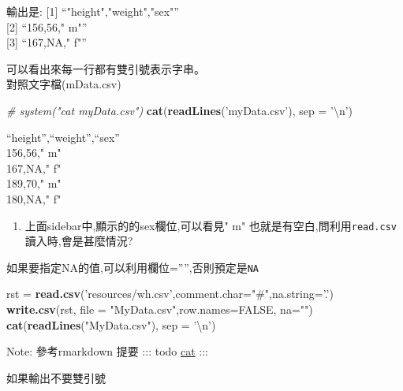 \documentclass[]{book}
\newenvironment{Shaded}{\begin{snugshade}}{\end{snugshade}}
\newcommand{\CharTok}[1]{\textcolor[rgb]{0.31,0.60,0.02}{#1}}
\newcommand{\CommentTok}[1]{\textcolor[rgb]{0.56,0.35,0.01}{\textit{#1}}}
\newcommand{\DataTypeTok}[1]{\textcolor[rgb]{0.13,0.29,0.53}{#1}}
\newcommand{\KeywordTok}[1]{\textcolor[rgb]{0.13,0.29,0.53}{\textbf{#1}}}
\newcommand{\NormalTok}[1]{#1}
\newcommand{\OtherTok}[1]{\textcolor[rgb]{0.56,0.35,0.01}{#1}}
\newcommand{\StringTok}[1]{\textcolor[rgb]{0.31,0.60,0.02}{#1}}
\providecommand{\tightlist}{%
  \setlength{\itemsep}{0pt}\setlength{\parskip}{0pt}}
\theoremstyle{definition}
\theoremstyle{definition}
\theoremstyle{definition}
\theoremstyle{remark}
\begin{document}
輸出是: {[}1{]} ``"height","weight","sex"''\\
{[}2{]} ``156,56," m"''\\
{[}3{]} ``167,NA," f"''

可以看出來每一行都有雙引號表示字串。\\
對照文字檔(mData.csv)

\begin{Shaded}
\begin{Highlighting}[]
\CommentTok{# system("cat myData.csv")}
\KeywordTok{cat}\NormalTok{(}\KeywordTok{readLines}\NormalTok{(}\StringTok{'myData.csv'}\NormalTok{), }\DataTypeTok{sep =} \StringTok{'}\CharTok{\textbackslash{}n}\StringTok{'}\NormalTok{)}
\end{Highlighting}
\end{Shaded}

``height'',``weight'',``sex''\\
156,56," m"\\
167,NA," f"\\
189,70," m"\\
180,NA," f"

\begin{enumerate}
\def\labelenumi{\arabic{enumi}.}
\tightlist
\item
  上面sidebar中,顯示的的sex欄位,可以看見" m"
  也就是有空白,問利用\texttt{read.csv} 讀入時,會是甚麼情況?
\end{enumerate}

如果要指定NA的值,可以利用欄位='''',否則預定是\texttt{NA}

\begin{Shaded}
\begin{Highlighting}[]
\NormalTok{rst =}\StringTok{ }\KeywordTok{read.csv}\NormalTok{(}\StringTok{'resources/wh.csv'}\NormalTok{,}\DataTypeTok{comment.char=}\StringTok{"#"}\NormalTok{,}\DataTypeTok{na.string=}\StringTok{'.'}\NormalTok{)}
\KeywordTok{write.csv}\NormalTok{(rst, }\DataTypeTok{file =} \StringTok{"MyData.csv"}\NormalTok{,}\DataTypeTok{row.names=}\OtherTok{FALSE}\NormalTok{, }\DataTypeTok{na=}\StringTok{""}\NormalTok{)}
\KeywordTok{cat}\NormalTok{(}\KeywordTok{readLines}\NormalTok{(}\StringTok{"MyData.csv"}\NormalTok{), }\DataTypeTok{sep =} \StringTok{'}\CharTok{\textbackslash{}n}\StringTok{'}\NormalTok{)}
\end{Highlighting}
\end{Shaded}

Note: 參考rmarkdown 提要 ::: todo
\href{doc:rmarkdown01\#terminal-out}{cat} :::

如果輸出不要雙引號
\end{document}
